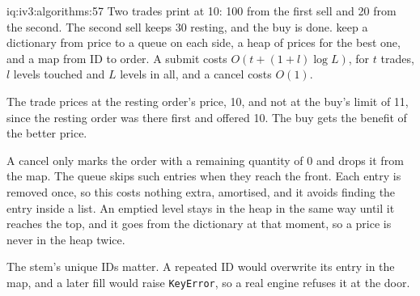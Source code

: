 \begin{solution}{iq:iv3:algorithms:57}
Two trades print at 10: 100 from the first sell and 20 from the second. The second sell keeps 30 resting, and the buy is done.  keep a dictionary from price to a queue on each side, a heap of prices for the best one, and a map from ID to order. A submit costs $O(t + (1 + l) \log L)$, for $t$ trades, $l$ levels touched and $L$ levels in all, and a cancel costs $O(1)$.
\label{lst:iv3:al:matching}
\label{lst:iv3:al:matchcancel}

The trade prices at the resting order's price, 10, and not at the buy's limit of 11, since the resting order was there first and offered 10. The buy gets the benefit of the better price.

A cancel only marks the order with a remaining quantity of 0 and drops it from the map. The queue skips such entries when they reach the front. Each entry is removed once, so this costs nothing extra, amortised, and it avoids finding the entry inside a list. An emptied level stays in the heap in the same way until it reaches the top, and it goes from the dictionary at that moment, so a price is never in the heap twice.

The stem's unique IDs matter. A repeated ID would overwrite its entry in the map, and a later fill would raise \texttt{KeyError}, so a real engine refuses it at the door.

\end{solution}

